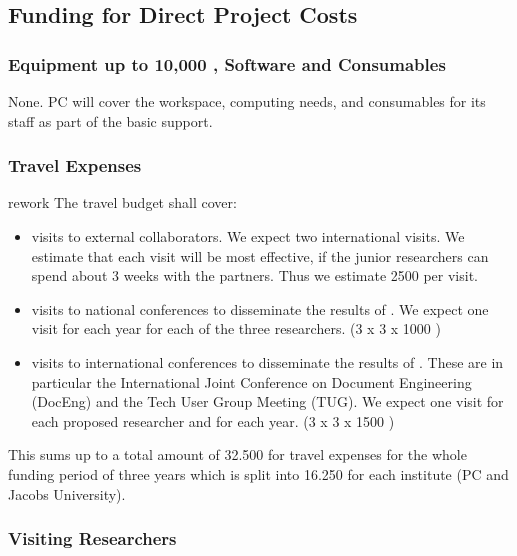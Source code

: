 \subsection{Funding for Direct Project Costs}\label{sec;funds:direct}

\subsubsection{Equipment up to 10,000 \texteuro, Software and Consumables}

None.  PC will cover the workspace, computing needs, and consumables for its staff as part
of the basic support.

\subsubsection{Travel Expenses}\label{sec:travel}

\begin{oldpart}{rework}
  The travel budget shall cover:
  \begin{itemize}
  \item visits to external collaborators. We expect two international visits. We estimate
    that each visit will be most effective, if the junior researchers can spend about 3
    weeks with the partners. Thus we estimate 2500 {\texteuro} per visit.
  \item visits to national conferences to disseminate the results of {\pn}. We expect
    one visit for each year for each of the three researchers. (3 x 3 x 1000 {\texteuro})
  \item visits to international conferences to disseminate the results of {\pn}. These
    are in particular the International Joint Conference on Document Engineering (DocEng)
    and the Tech User Group Meeting (TUG). We expect one visit for each proposed
    researcher and for each year. (3 x 3 x 1500 {\texteuro})
  \end{itemize}

  This sums up to a total amount of 32.500 {\texteuro} for travel expenses for the whole
  funding period of three years which is split into 16.250 {\texteuro} for each institute
  (PC and Jacobs University).
\end{oldpart}

\subsubsection{Visiting Researchers}\label{sec:funds:visiting}

